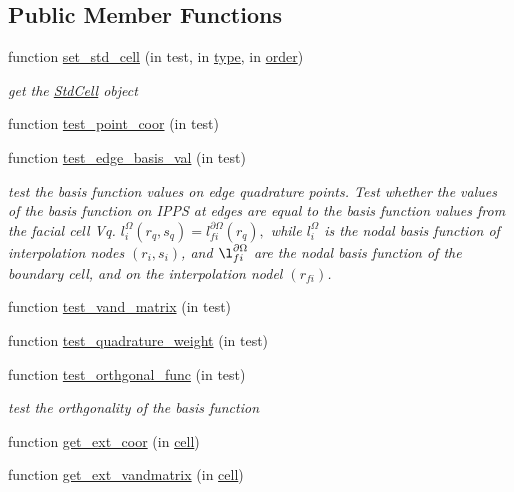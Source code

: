 \subsection*{Public Member Functions}
\begin{DoxyCompactItemize}
\item 
function \hyperlink{class_std_cell_test_a07438c5c440eda75610e1b36490926d3}{set\+\_\+std\+\_\+cell} (in test, in \hyperlink{class_std_cell_test_a682c89deef81edd34d9e5fe7c84a022c}{type}, in \hyperlink{class_std_cell_test_a4f213b4195801baf37b26318f3aa3da1}{order})
\begin{DoxyCompactList}\small\item\em get the \hyperlink{class_std_cell}{Std\+Cell} object \end{DoxyCompactList}\item 
function \hyperlink{class_std_cell_test_af0d37fce9f3b45f745f9450861813c3e}{test\+\_\+point\+\_\+coor} (in test)
\item 
function \hyperlink{class_std_cell_test_ac3fd2a9d0f6340ec57fbcf0cc895e61c}{test\+\_\+edge\+\_\+basis\+\_\+val} (in test)
\begin{DoxyCompactList}\small\item\em test the basis function values on edge quadrature points. Test whether the values of the basis function on I\+P\+PS at edges are equal to the basis function values from the facial cell Vq. $ l_i^{\Omega}(r_q, s_q) = l_{fi}^{\partial \Omega}(r_q), $ while $ l_i^{\Omega} $ is the nodal basis function of interpolation nodes $(r_i, s_i)$, and $ \l_{fi}^{\partial \Omega} $ are the nodal basis function of the boundary cell, and on the interpolation nodel $(r_{fi})$. \end{DoxyCompactList}\item 
function \hyperlink{class_std_cell_test_ad668015703d9cd0712f7da6b068eadec}{test\+\_\+vand\+\_\+matrix} (in test)
\item 
function \hyperlink{class_std_cell_test_a0c6e2a271116021fc3b8812ecb58a6b4}{test\+\_\+quadrature\+\_\+weight} (in test)
\item 
function \hyperlink{class_std_cell_test_a0ec69ee05cbd6605acf74b04191ff19d}{test\+\_\+orthgonal\+\_\+func} (in test)
\begin{DoxyCompactList}\small\item\em test the orthgonality of the basis function \end{DoxyCompactList}\item 
function \hyperlink{class_std_cell_test_a4140689ee6d75083b6546a334c1d032b}{get\+\_\+ext\+\_\+coor} (in \hyperlink{class_std_cell_test_a24b5d8a0c7f63a12a95c8896b5d1b6ed}{cell})
\item 
function \hyperlink{class_std_cell_test_a34e456bd3242bf8b0c6796a94a6a3dae}{get\+\_\+ext\+\_\+vandmatrix} (in \hyperlink{class_std_cell_test_a24b5d8a0c7f63a12a95c8896b5d1b6ed}{cell})
\end{DoxyCompactItemize}

